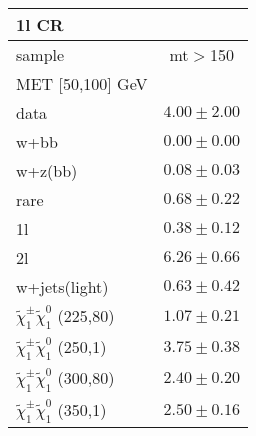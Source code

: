 \begin{table}
\begin{center}
\small
\begin{tabular}{lc}
\hline
1l CR & \\
\hline
sample&mt$>$150\\
\hline
MET [50,100] GeV &  \\
\hline
data&$4.00\pm2.00$\\
\hline
w+bb&$0.00\pm0.00$\\
w+z(bb)&$0.08\pm0.03$\\
rare&$0.68\pm0.22$\\
1l&$0.38\pm0.12$\\
2l&$6.26\pm0.66$\\
w+jets(light)&$0.63\pm0.42$\\
$\tilde{\chi}_{1}^{\pm}\tilde{\chi}_{1}^{0}$ (225,80)&$1.07\pm0.21$\\
$\tilde{\chi}_{1}^{\pm}\tilde{\chi}_{1}^{0}$ (250,1)&$3.75\pm0.38$\\
$\tilde{\chi}_{1}^{\pm}\tilde{\chi}_{1}^{0}$ (300,80)&$2.40\pm0.20$\\
$\tilde{\chi}_{1}^{\pm}\tilde{\chi}_{1}^{0}$ (350,1)&$2.50\pm0.16$\\
\hline
\hline\hline
\hline
\end{tabular}
\end{center}
\end{table}
